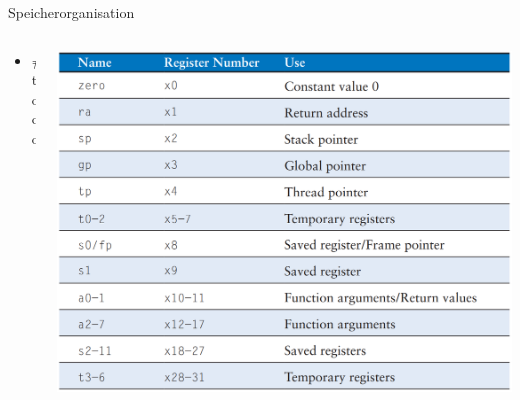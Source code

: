 \documentclass[
  german,            %
  aspectratio=169,    %
]{tumbeamer}
\begin{document}
\begin{frame}[c]{Speicherorganisation}{}
  \begin{columns}[c]
    \begin{column}{0.5\textwidth}
      \begin{itemize}
        \item \#todo
      \end{itemize}
    \end{column}
    \begin{column}{0.5\textwidth}
      \includegraphics[width=\linewidth]{riscv_registers.png}
    \end{column}
  \end{columns}
\end{frame}
\end{document}

